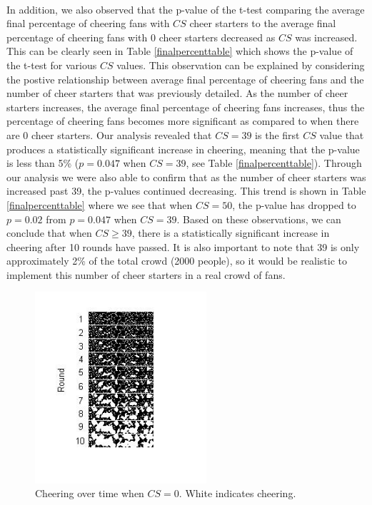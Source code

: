 \documentclass[oneside,12pt]{report}
\begin{document}
\paragraph{}
In addition, we also observed that the p-value of the t-test comparing the average final percentage of cheering fans with $CS$ cheer starters to the average final percentage of cheering fans with 0 cheer starters decreased as $CS$ was increased. This can be clearly seen in Table \ref{finalpercenttable} which shows the p-value of the t-test for various $CS$ values. This observation can be explained by considering the postive relationship between average final percentage of cheering fans and the number of cheer starters that was previously detailed. As the number of cheer starters increases, the average final percentage of cheering fans increases, thus the percentage of cheering fans becomes more significant as compared to when there are 0 cheer starters. Our analysis revealed that $CS=39$ is the first $CS$ value that produces a statistically significant increase in cheering, meaning that the p-value is less than 5\% ($p=0.047$ when $CS=39$, see Table \ref{finalpercenttable}). Through our analysis we were also able to confirm that as the number of cheer starters was increased past 39, the p-values continued decreasing. This trend is shown in Table \ref{finalpercenttable} where we see that when $CS=50$, the p-value has dropped to $p=0.02$ from $p=0.047$ when $CS=39$. Based on these observations, we can conclude that when $CS\geq39$, there is a statistically significant increase in cheering after 10 rounds have passed. It is also important to note that 39 is only approximately 2\% of the total crowd (2000 people), so it would be realistic to implement this number of cheer starters in a real crowd of fans. 

\begin{figure}[h!]
    		\begin{center}
    		  \includegraphics [width=2.5in] {n=0,46.jpg}
    			\caption [Pictorial Representation of Cheering Over Time with 0 Cheer Starters] {Cheering over time when $CS=0$. White indicates cheering.}
    			\label{cs0hist}
    			\end{center}
 \end{figure}
 
\end{document}
